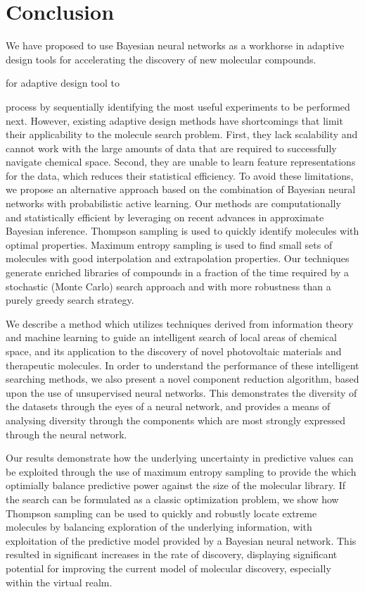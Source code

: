 \section{Conclusion}

We have proposed to use Bayesian neural networks as a workhorse in adaptive design tools for accelerating the discovery of new molecular compounds. 

for adaptive design tool to


process by sequentially identifying the most useful experiments to be performed
next. However, existing adaptive design methods have shortcomings that limit
their applicability to the molecule search problem. First, they lack
scalability and cannot work with the large amounts of data that are required to
successfully navigate chemical space. Second, they are unable to learn feature
representations for the data, which reduces their statistical efficiency. To
avoid these limitations, we propose an alternative approach based on the
combination of Bayesian neural networks with probabilistic active learning. Our
methods are computationally and statistically efficient by leveraging on recent
advances in approximate Bayesian inference. Thompson
sampling is used to quickly identify molecules with optimal properties.
Maximum entropy sampling is used
to find small sets of molecules with good interpolation and extrapolation properties.
Our techniques generate enriched libraries of compounds in a fraction
of the time required by a stochastic (Monte Carlo) search approach and with
more robustness than a purely greedy search strategy.

We describe a method which utilizes techniques derived from information theory and machine learning to guide an intelligent search of local areas of chemical space, and its application to the discovery of novel photovoltaic materials and therapeutic molecules.  In order to understand the performance of these intelligent searching methods, we also present a novel component reduction algorithm, based upon the use of unsupervised neural networks.  This demonstrates the diversity of the datasets through the eyes of a neural network, and provides a means of analysing diversity through the components which are most strongly expressed through the neural network.  

Our results demonstrate how the underlying uncertainty in predictive values can be exploited through the use of maximum entropy sampling to provide the which optimially balance predictive power against the size of the molecular library. If the search can be formulated as a classic optimization problem, we show how Thompson sampling can be used to quickly and robustly locate extreme molecules by balancing exploration of the underlying information, with exploitation of the predictive model provided by a Bayesian neural network. This resulted in significant increases in the rate of discovery, displaying significant potential for improving the current model of molecular discovery, especially within the virtual realm.
